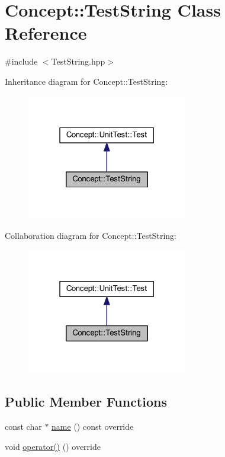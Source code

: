\hypertarget{class_concept_1_1_test_string}{}\section{Concept\+::Test\+String Class Reference}
\label{class_concept_1_1_test_string}


{\ttfamily \#include $<$Test\+String.\+hpp$>$}



Inheritance diagram for Concept\+::Test\+String\+:\nopagebreak
\begin{figure}[H]
\begin{center}
\leavevmode
\includegraphics[width=199pt]{class_concept_1_1_test_string__inherit__graph}
\end{center}
\end{figure}


Collaboration diagram for Concept\+::Test\+String\+:\nopagebreak
\begin{figure}[H]
\begin{center}
\leavevmode
\includegraphics[width=199pt]{class_concept_1_1_test_string__coll__graph}
\end{center}
\end{figure}
\subsection*{Public Member Functions}
\begin{DoxyCompactItemize}
\item 
const char $\ast$ \mbox{\hyperlink{class_concept_1_1_test_string_a0d43f2724c9d8c3eec87076cdd418461}{name}} () const override
\item 
void \mbox{\hyperlink{class_concept_1_1_test_string_a4d493ef2d0632c5015042821be5682ff}{operator()}} () override
\end{DoxyCompactItemize}
